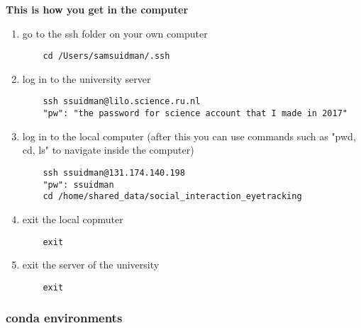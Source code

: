 \documentclass{article}
\begin{document}
\textbf{This is how you get in the computer}

\begin{enumerate}
    \item go to the ssh folder on your own computer
    \begin{verbatim}
    cd /Users/samsuidman/.ssh
    \end{verbatim}
    
    \item log in to the university server
    \begin{verbatim}
    ssh ssuidman@lilo.science.ru.nl
    "pw": "the password for science account that I made in 2017"
    \end{verbatim}
    
    \item log in to the local computer (after this you can use commands such as "pwd, cd, ls" to navigate inside the computer)
    \begin{verbatim}    
    ssh ssuidman@131.174.140.198
    "pw": ssuidman
    cd /home/shared_data/social_interaction_eyetracking
    \end{verbatim}
    
    \item exit the local copmuter
    \begin{verbatim}
    exit
    \end{verbatim}
    
    \item exit the server of the university
    \begin{verbatim}
    exit 
    \end{verbatim}
\end{enumerate}


\subsubsection{conda environments}
\end{document}
